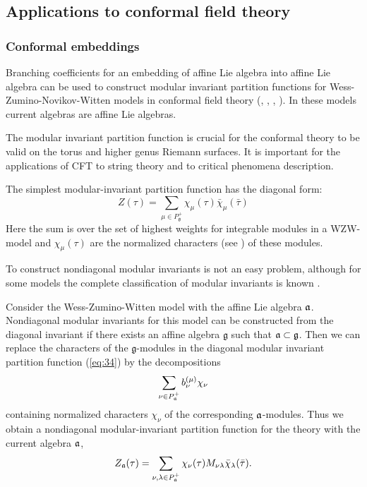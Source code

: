 \subsection{Applications to conformal field theory}
\label{sec:phys-appl}

\subsubsection{Conformal embeddings}
\label{sec:conformal-embeddings}

Branching coefficients for an embedding of affine Lie algebra into
affine Lie algebra can be used to construct modular invariant
partition functions for Wess-Zumino-Novikov-Witten models in conformal field theory
(\cite{difrancesco1997cft}, \cite{Walton:1999xc}, \cite{walton1989conformal}, \cite{schellekens1986conformal}).
In these models current algebras are affine Lie algebras.

The modular invariant partition function is crucial for the conformal theory to be valid
on the torus and higher genus Riemann surfaces. It is important for the applications of
CFT to string theory and to critical phenomena description.

The simplest modular-invariant partition function has the diagonal form:
\begin{equation}
  \label{eq:34}
   Z(\tau)=\sum_{ \mu\in P^{+}_{\mathfrak{g}}} \chi_{\mu}(\tau)\bar \chi_{\mu}(\bar \tau)
\end{equation}
Here the sum is over the set of highest weights for integrable modules in a WZW-model
and $\chi_{\mu}(\tau)$ are the normalized characters (see \cite{difrancesco1997cft}) of these modules.

To construct nondiagonal modular invariants is not an easy problem,
although for some models the complete classification of modular invariants is known \cite{1994hepthGannon,1995JMPGannon}.

Consider the Wess-Zumino-Witten model with the affine Lie algebra $\mathfrak{a}$.
Nondiagonal modular invariants for this model can be constructed from the diagonal
invariant if there exists an affine algebra $\mathfrak{g}$ such that $\mathfrak{a}\subset\mathfrak{g}$.
Then we can replace the characters of the $\mathfrak{g}$-modules in the diagonal
modular invariant partition function (\ref{eq:34})
by the decompositions
\begin{equation*}
  \label{eq:32}
\sum_{\nu \in P^{+}_{\mathfrak{a}}}b^{(\mu)}_{\nu} \chi_{\nu}
\end{equation*}
containing normalized characters $\chi_{\nu}$ of the corresponding $\mathfrak{a}$-modules.
Thus we obtain a nondiagonal modular-invariant  partition function for the theory with
the current algebra $\mathfrak{a}$,
\begin{equation}
  \label{eq:36}
   Z_{\mathfrak{a}}(\tau)=\sum_{ \nu,\lambda\in P^{+}_{\mathfrak{a}}} \chi_{\nu}(\tau)M_{\nu\lambda}\bar \chi_{\lambda}(\bar \tau).
\end{equation}

